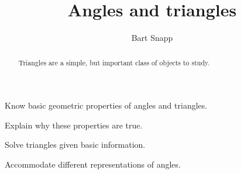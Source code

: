 \documentclass[handout,nooutcomes,noauthor]{ximera}
\title{Angles and triangles}
\author{Bart Snapp}
\begin{document}
\begin{abstract}
  Triangles are a simple, but important class of objects to study.
\end{abstract}
\maketitle


\begin{listSectionOutcomes}
\item Know basic geometric properties of angles and triangles.
\item Explain why these properties are true.
\item Solve triangles given basic information.
\item Accommodate different representations of angles.
\end{listSectionOutcomes}
\end{document}
